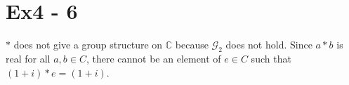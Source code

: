 \section*{Ex4 - 6}
$ * $ does not give a group structure on $ \mathbb{C} $ because $ \mathscr{G}_2 $ does not hold. Since $ a * b $ is real for all $ a, b \in C $, there cannot be an element of $ e \in C $ such that $ (1 + i) * e = (1 + i) $.